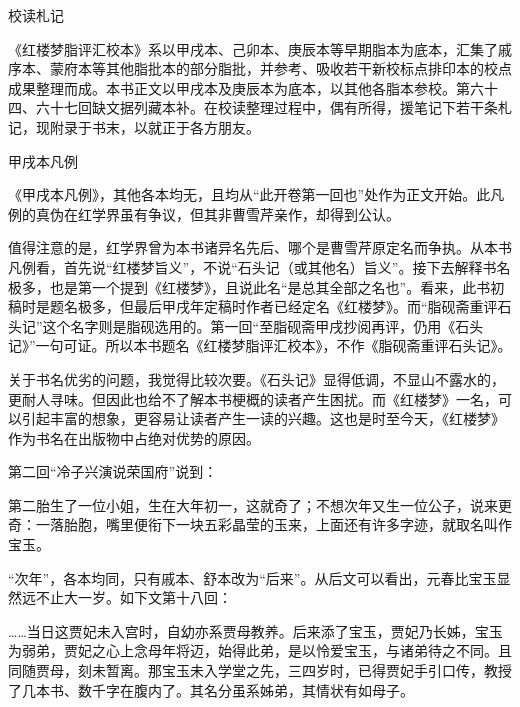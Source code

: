 \newpage

\begin{center}
	{\Huge \heiti 校读札记}
\end{center}



《红楼梦脂评汇校本》系以甲戌本、己卯本、庚辰本等早期脂本为底本，汇集了戚序本、蒙府本等其他脂批本的部分脂批，并参考、吸收若干新校标点排印本的校点成果整理而成。本书正文以甲戌本及庚辰本为底本，以其他各脂本参校。第六十四、六十七回缺文据列藏本补。在校读整理过程中，偶有所得，援笔记下若干条札记，现附录于书末，以就正于各方朋友。

{\begin{center}
	\kaishu \LARGE 	甲戌本凡例
\end{center}}

《甲戌本凡例》，其他各本均无，且均从``此开卷第一回也''处作为正文开始。此凡例的真伪在红学界虽有争议，但其非曹雪芹亲作，却得到公认。

值得注意的是，红学界曾为本书诸异名先后、哪个是曹雪芹原定名而争执。从本书凡例看，首先说``红楼梦旨义''，不说``石头记（或其他名）旨义''。接下去解释书名极多，也是第一个提到《红楼梦》，且说此名``是总其全部之名也''。看来，此书初稿时是题名极多，但最后甲戌年定稿时作者已经定名《红楼梦》。而``脂砚斋重评石头记''这个名字则是脂砚选用的。第一回``至脂砚斋甲戌抄阅再评，仍用《石头记》''一句可证。所以本书题名《红楼梦脂评汇校本》，不作《脂砚斋重评石头记》。

关于书名优劣的问题，我觉得比较次要。《石头记》显得低调，不显山不露水的，更耐人寻味。但因此也给不了解本书梗概的读者产生困扰。而《红楼梦》一名，可以引起丰富的想象，更容易让读者产生一读的兴趣。这也是时至今天，《红楼梦》作为书名在出版物中占绝对优势的原因。

{{}}

第二回``冷子兴演说荣国府''说到：

第二胎生了一位小姐，生在大年初一，这就奇了；不想次年又生一位公子，说来更奇：一落胎胞，嘴里便衔下一块五彩晶莹的玉来，上面还有许多字迹，就取名叫作宝玉。

``次年''，各本均同，只有戚本、舒本改为``后来''。从后文可以看出，元春比宝玉显然远不止大一岁。如下文第十八回：

\ldots{}\ldots{}当日这贾妃未入宫时，自幼亦系贾母教养。后来添了宝玉，贾妃乃长姊，宝玉为弱弟，贾妃之心上念母年将迈，始得此弟，是以怜爱宝玉，与诸弟待之不同。且同随贾母，刻未暂离。那宝玉未入学堂之先，三四岁时，已得贾妃手引口传，教授了几本书、数千字在腹内了。其名分虽系姊弟，其情状有如母子。


